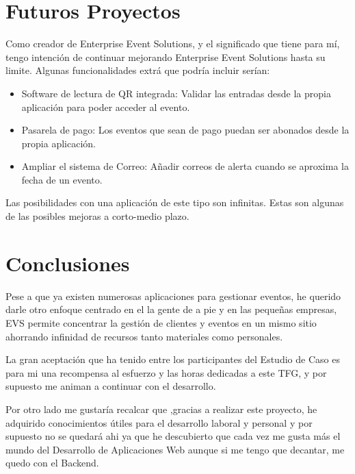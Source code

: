 \section{Futuros Proyectos}
Como creador de Enterprise Event Solutions, y el significado que tiene para mí, tengo intención de continuar mejorando Enterprise Event Solutions hasta
su limite. Algunas funcionalidades extrá que podría incluir serían:
\begin{itemize}
    \item Software de lectura de QR integrada: Validar las entradas desde la propia aplicación para poder acceder al evento.
    \item Pasarela de pago: Los eventos que sean de pago puedan ser abonados desde la propia aplicación. 
    \item Ampliar el sistema de Correo: Añadir correos de alerta cuando se aproxima la fecha de un evento.
\end{itemize}

Las posibilidades con una aplicación de este tipo son infinitas. Estas son algunas de las posibles mejoras a corto-medio plazo. 

\section{Conclusiones}
Pese a que ya existen numerosas aplicaciones para gestionar eventos, he querido darle otro enfoque centrado en el la gente de a pie y en las pequeñas empresas,
EVS permite concentrar la gestión de clientes y eventos en un mismo sitio ahorrando infinidad de recursos tanto materiales como personales. 

La gran aceptación que ha tenido entre los participantes del Estudio de Caso es para mi una recompensa al esfuerzo y las horas dedicadas a este TFG, y por supuesto
me animan a continuar con el desarrollo.

Por otro lado me gustaría recalcar que ,gracias a realizar este proyecto, he adquirido conocimientos útiles para el desarrollo laboral y personal y por 
supuesto no se quedará ahi ya que he descubierto que cada vez me gusta más el mundo del Desarrollo de Aplicaciones Web aunque si me tengo que decantar, me quedo con
el Backend.
